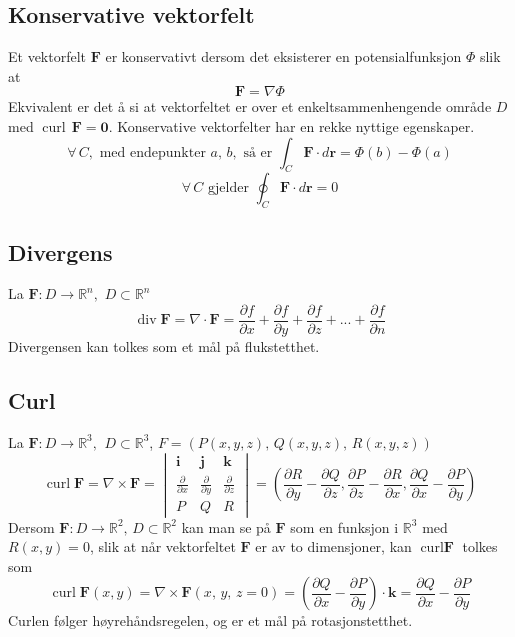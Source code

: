 \documentclass[fleqn,12pt]{wlscirep}
\begin{document}
\subsection{Konservative vektorfelt}
Et vektorfelt $\textbf{F}$ er konservativt dersom det eksisterer en potensialfunksjon $\Phi$ slik at 
\begin{equation}
    \textbf{F} = \nabla \Phi
\end{equation}
Ekvivalent er det å si at vektorfeltet er over et enkeltsammenhengende område $D$ med $\operatorname{curl}\,\textbf{F} = \textbf{0}$.
Konservative vektorfelter har en rekke nyttige egenskaper. 
\begin{equation}
    \forall\, C,\text{ med endepunkter } a, \, b, \text{ så er } \int_C \textbf{F} \cdot d\textbf{r} = \Phi (b) - \Phi(a) 
\end{equation}
\begin{equation}
    \forall \, C \text{ gjelder } \oint_C \textbf{F}\cdot d\textbf{r} = 0
\end{equation}
\subsection{Divergens}
La $\textbf{F}: D \to \mathbb{R}^n,\,\, D \subset \mathbb{R}^n$
\begin{equation}
    \operatorname{div} \textbf{F} = \nabla \cdot \textbf{F} = \frac{\partial f}{\partial x} + \frac{\partial f}{\partial y} + \frac{\partial f}{\partial z}+ ... + \frac{\partial f}{\partial n}
\end{equation}
Divergensen kan tolkes som et mål på flukstetthet.
\subsection{Curl}
La $\textbf{F} : D \to \mathbb{R}^3,\, \ D \subset \mathbb{R}^3$, $F = (P(x,y,z),\, Q(x,y,z),\, R(x,y,z))$
\begin{equation}
    \operatorname{curl} \textbf{F} = \nabla \times \textbf{F} = 
    \begin{vmatrix}
    \textbf{i}&\textbf{j}&\textbf{k}\\
    \frac{\partial}{\partial x} & \frac{\partial}{ \partial y} & \frac{\partial}{ \partial z} \\
    P & Q & R
    \end{vmatrix} = \left(\frac{\partial R}{\partial y} - \frac{\partial Q}{\partial z}, \frac{\partial P}{\partial z} - \frac{\partial R}{\partial x}, \frac{\partial Q}{\partial x} -\frac{\partial P}{\partial y} \right)
\end{equation}
Dersom $\textbf{F} : D \to \mathbb{R}^2,\, D \subset \mathbb{R}^2$ kan man se på $\textbf{F}$ som en funksjon i $\mathbb{R}^3$ med $R(x, y) = 0$, slik at når vektorfeltet $\textbf{F}$ er av to dimensjoner, kan $\operatorname{curl} \textbf{F}$ tolkes som
\begin{equation}
    \operatorname{curl} \textbf{F}(x,y) = \nabla \times \textbf{F} (x,\,y,\, z = 0) = \left(\frac{\partial Q}{\partial x} -\frac{\partial P}{\partial y} \right) \cdot \textbf{k} = \frac{\partial Q}{\partial x} -\frac{\partial P}{\partial y}
\end{equation}
Curlen følger høyrehåndsregelen, og er et mål på rotasjonstetthet.
\end{document}
